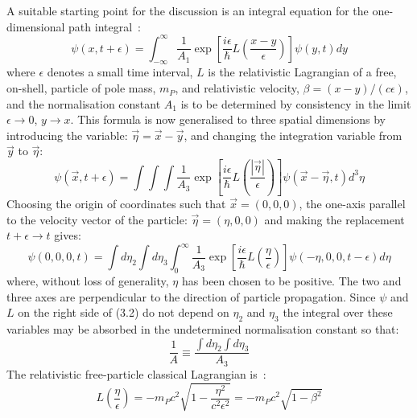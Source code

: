 {   A suitable starting point for the discussion is an integral
  equation for the one-dimensional path integral~\cite{Feyn8}:
  \begin{equation}
 \psi(x,t+\epsilon) = \int_{-\infty}^{\infty}\frac{1}{A_1} \exp\left[
  \frac{i \epsilon}{\hbar} L\left(\frac{x-y}{\epsilon}\right)\right] \psi(y,t) dy
 \end{equation}
 where $\epsilon$ denotes a small time interval, $L$ is the relativistic Lagrangian of 
  a free, on-shell, particle of pole mass, $m_P$, and relativistic velocity,
  $\beta = (x-y)/(c\epsilon)$, and the normalisation constant $A_1$ is to be determined by consistency
   in the limit
  $\epsilon \rightarrow 0$, $y \rightarrow x$. This formula is now generalised to three
   spatial dimensions by introducing the variable: $\vec{\eta} = \vec{x} - \vec{y}$,
   and changing the integration variable from $\vec{y}$ to  $\vec{\eta}$:
  \begin{equation}
 \psi(\vec{x},t+\epsilon) = \int \int \int \frac{1}{A_3} \exp\left[
  \frac{i \epsilon}{\hbar} L\left(\frac{|\vec{\eta}|}{\epsilon}\right)\right]
   \psi( \vec{x}-\vec{\eta},t) d^3\eta
 \end{equation}
   Choosing the
   origin of coordinates such that $\vec{x} = (0,0,0)$, the one-axis parallel to the velocity 
  vector of the particle: $\vec{\eta} = (\eta, 0, 0)$
   and making the replacement $t+\epsilon \rightarrow t$ gives:
  \begin{equation}
 \psi(0,0,0,t) = \int d \eta_2 \int d \eta_3  \int_{0}^{\infty}\frac{1}{A_3} \exp\left[
  \frac{i \epsilon}{\hbar} L\left(\frac{\eta}{\epsilon}\right)\right] \psi(-\eta, 0,0,t-\epsilon) d \eta
 \end{equation}
 where, without loss of generality, $\eta$ has been chosen to be positive.
 The two and three axes are 
  perpendicular to the direction of particle propagation. Since $\psi$ and $L$ on the right side of (3.2)
  do not depend on $\eta_2$ and $\eta_3$ the integral over these variables may be absorbed in the
  undetermined normalisation  constant so that:
  \begin{equation}
   \frac{1}{A} \equiv \frac{\int d \eta_2 \int d \eta_3}{A_3}
  \end{equation}
   The relativistic free-particle classical Lagrangian is~\cite{Goldstein}:
  \begin{equation}
 L\left(\frac{\eta}{\epsilon}\right) = -m_P c^2\sqrt{1-\frac{\eta^2}{c^2 \epsilon^2}}
  = -m_P c^2\sqrt{1-\beta^2}  
  \end{equation}
}
